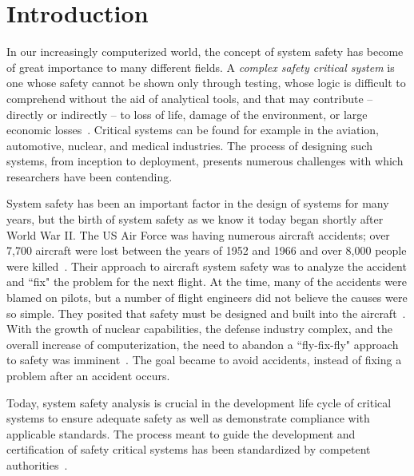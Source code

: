 \chapter{Introduction}
\label{chap:intro}
In our increasingly computerized world, the concept of system safety has become of great importance to many different fields. A \emph{complex safety critical system} is one whose safety cannot be shown only through testing, whose logic is difficult to comprehend without the aid of analytical tools, and that may contribute -- directly or indirectly -- to loss of life, damage of the environment, or large economic losses~\cite{SAE}. Critical systems can be found for example in the aviation, automotive, nuclear, and medical industries.  The process of designing such systems, from inception to deployment, presents numerous challenges with which researchers have been contending. 

System safety has been an important factor in the design of systems for many years, but the birth of system safety as we know it today began shortly after World War II. The US Air Force was having numerous aircraft accidents; over 7,700 aircraft were lost between the years of 1952 and 1966 and over 8,000 people were killed~\cite{hammer}. Their approach to aircraft system safety was to analyze the accident and ``fix" the problem for the next flight. At the time, many of the accidents were blamed on pilots, but a number of flight engineers did not believe the causes were so simple. They posited that safety must be designed and built into the aircraft~\cite{levesonWhitePaper}. With the growth of nuclear capabilities, the defense industry complex, and the overall increase of computerization, the need to abandon a ``fly-fix-fly" approach to safety was imminent~\cite{miller1954applying, levesonWhitePaper, hammer}. The goal became to avoid accidents, instead of fixing a problem after an accident occurs.

Today, system safety analysis is crucial in the development life cycle of critical systems to ensure adequate safety as well as demonstrate compliance with applicable standards. The process meant to guide the development and certification of safety critical systems has been standardized by competent authorities~\cite{SAE,SAE:ARP4761,SAE:ARP4754A}.

